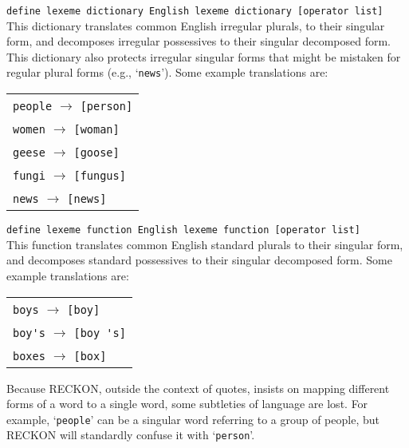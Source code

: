 \documentclass[12pt]{article}
\begin{document}
\begin{list}{}{}

\item
\verb|define lexeme dictionary English lexeme dictionary [operator list]|\\[1ex]
This dictionary translates common English irregular plurals,
to their singular form, and decomposes
irregular possessives to their singular decomposed form.
This dictionary also protects irregular singular forms that might be
mistaken for regular plural forms (e.g., `\verb|news|').
Some example translations are:

\begin{center}
\begin{tabular}{l}
\verb|people| $\longrightarrow$ \verb|[person]| \\
\verb|women| $\longrightarrow$ \verb|[woman]| \\
\verb|geese| $\longrightarrow$ \verb|[goose]| \\
\verb|fungi| $\longrightarrow$ \verb|[fungus]| \\
\verb|news| $\longrightarrow$ \verb|[news]| \\
\end{tabular}
\end{center}

\item
\verb|define lexeme function English lexeme function [operator list]|\\[1ex]
This function translates common English standard plurals
to their singular form, and decomposes
standard possessives to their singular decomposed form.
Some example translations are:

\begin{center}
\begin{tabular}{l}
\verb|boys| $\longrightarrow$ \verb|[boy]| \\
\verb|boy's| $\longrightarrow$ \verb|[boy 's]| \\
\verb|boxes| $\longrightarrow$ \verb|[box]| \\
\end{tabular}
\end{center}

\end{list}

Because RECKON, outside the context of quotes,
insists on mapping different forms of a word to a single
word, some subtleties of language are lost.  For example, `\verb|people|'
can be a singular word referring to a group of people, but RECKON will
standardly confuse it with `\verb|person|'.
\end{document}
